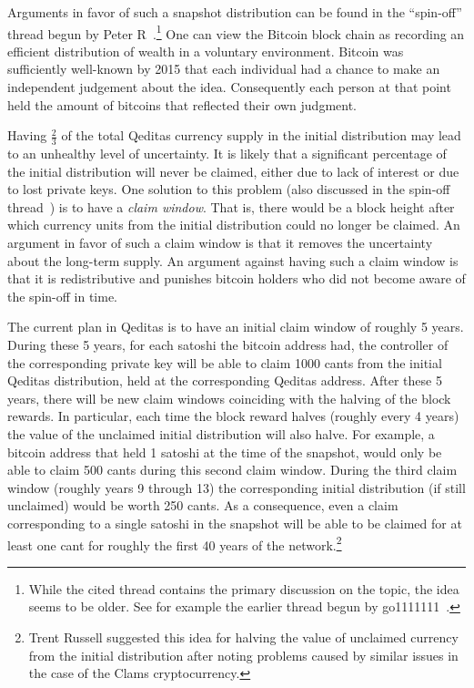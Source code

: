 \documentclass{article}
\begin{document}
Arguments in favor of such a snapshot distribution
can be found in the ``spin-off'' thread begun by Peter R~\cite{Spinoff}.\footnote{While the cited thread contains the primary discussion on the topic, the idea seems to be older. See for example the earlier thread begun by go1111111~\cite{PreSpinoff}.}
One can view the Bitcoin block chain as recording an efficient distribution
of wealth in a voluntary environment.
Bitcoin was sufficiently well-known by 2015
that each individual had a chance to make an independent judgement about the idea.
Consequently each person at that point held the amount of bitcoins that reflected their own judgment.

Having $\frac{2}{3}$ of the total Qeditas currency supply in the initial distribution
may lead to an unhealthy level of uncertainty. It is likely that a significant percentage of the initial
distribution will never be claimed, either due to lack of interest or due to lost private keys.
One solution to this problem (also discussed in the spin-off thread~\cite{Spinoff})
is to have a {\em{claim window}}. That is, there would be a block height after which
currency units from the initial distribution could no longer be claimed.
An argument in favor of such a claim window is that it removes the uncertainty about the long-term supply.
An argument against having such a claim window is that it is redistributive and punishes bitcoin holders
who did not become aware of the spin-off in time.

The current plan in Qeditas is to have an initial claim window of roughly 5 years.
During these 5 years, for each satoshi the bitcoin address had, the controller of the corresponding
private key will be able to claim 1000 cants from the initial Qeditas distribution, held at the corresponding
Qeditas address.
After these 5 years, there will be new claim windows coinciding with the halving of the block rewards.
In particular, each time the block reward halves (roughly every 4 years) the value of the 
unclaimed initial distribution will also halve. For example, a bitcoin address that held 1 satoshi
at the time of the snapshot, would only be able to claim 500 cants during this second claim window.
During the third claim window (roughly years 9 through 13) the corresponding initial distribution (if still unclaimed)
would be worth 250 cants.
As a consequence, even a claim corresponding to a single satoshi in the snapshot will
be able to be claimed for at least one cant for roughly the first 40 years of the network.\footnote{Trent Russell 
suggested this idea for halving the value of unclaimed currency from the initial distribution
after noting problems caused by similar issues in the case of the Clams cryptocurrency.}
\end{document}
